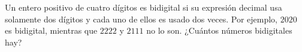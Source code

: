 Un entero positivo de cuatro dígitos es bidigital si su expresión decimal usa solamente dos dígitos y cada uno de ellos es usado dos veces. Por ejemplo, $2020$ es bidigital, mientras que $2222$ y $2111$ no lo son. ¿Cuántos números bidigitales hay?